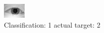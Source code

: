\begin{figure}[h!]
\begin{center}
\includegraphics[width=0.60\columnwidth]{figures/ID873_class_1_target_2.png}
\end{center}
\caption{ Classification: 1 actual target: 2}
\label{fig:ID873_class_1_target_2}
\end{figure}
